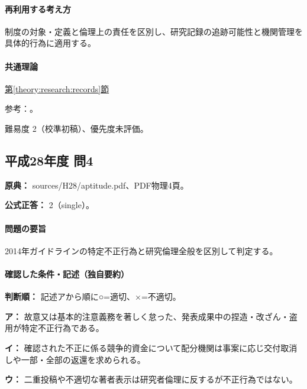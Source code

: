 \paragraph{再利用する考え方} 制度の対象・定義と倫理上の責任を区別し、研究記録の追跡可能性と機関管理を具体的行為に適用する。

\paragraph{共通理論} \hyperref[theory:research:records]{第\ref*{theory:research:records}節}

\par 参考：\cite{mext_misconduct2014,jsps_integrity2025}。

\par 難易度 2（校準初稿）、優先度未評価。

\subsection{平成28年度 問4}
\label{q:h28-reg-apt-04}

\noindent\textbf{原典：} sources/H28/aptitude.pdf、PDF物理4頁。

\textbf{公式正答：} 2（single）。

\paragraph{問題の要旨} 2014年ガイドラインの特定不正行為と研究倫理全般を区別して判定する。

\paragraph{確認した条件・記述（独自要約）}\mbox{}\par

\noindent\textbf{判断順：} 記述アから順に○=適切、×=不適切。\par

\noindent\textbf{ア：} 故意又は基本的注意義務を著しく怠った、発表成果中の捏造・改ざん・盗用が特定不正行為である。\par

\noindent\textbf{イ：} 確認された不正に係る競争的資金について配分機関は事案に応じ交付取消しや一部・全部の返還を求められる。\par

\noindent\textbf{ウ：} 二重投稿や不適切な著者表示は研究者倫理に反するが不正行為ではない。\par

